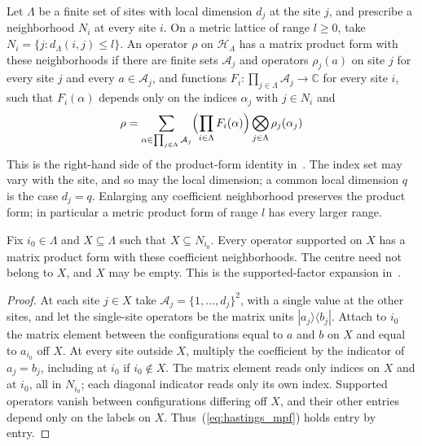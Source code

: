 \begin{definition}
    \label{def:hastings_product_form}
    \leanok
    Let $\Lambda$ be a finite set of sites with local dimension $d_j$ at the
    site $j$, and prescribe a neighborhood $N_i$ at every site $i$. On a
    metric lattice of range $l\ge0$, take $N_i=\{j:d_\Lambda(i,j)\le l\}$.
    An operator $\rho$ on $\mathcal H_\Lambda$ has a matrix product form
    with these neighborhoods if there are finite sets $\mathcal A_j$ and operators
    $\rho_j(a)$ on site $j$ for every site $j$ and every
    $a\in\mathcal A_j$, and functions
    $F_i\colon\prod_{j\in\Lambda}\mathcal A_j\to\mathbb C$
    for every site $i$, such that $F_i(\alpha)$ depends only on the indices
    $\alpha_j$ with $j\in N_i$ and
    \begin{align}
        \label{eq:hastings_mpf}
        \rho=\sum_{\alpha\in\prod_{j\in\Lambda}\mathcal A_j}
        \Bigl(\prod_{i\in\Lambda}F_i(\alpha)\Bigr)
        \bigotimes_{j\in\Lambda}\rho_j(\alpha_j)
    \end{align}
    This is the right-hand side of the product-form identity in~\cite[lines
        1024--1039]{Hastings2006Solving}. The index set may vary with the site,
    and so may the local dimension; a common local dimension $q$ is the case
    $d_j=q$.
    Enlarging any coefficient neighborhood
    preserves the product form; in particular a metric product form of range
    $l$ has every larger range.
\end{definition}

\begin{lemma}
    \label{thm:hastings_product_form_supported_radius}
    \leanok
    Fix $i_0\in\Lambda$ and $X\subseteq\Lambda$ such that
    $X\subseteq N_{i_0}$.
    Every operator supported on $X$ has a matrix product form with these
    coefficient neighborhoods.
    The centre need not belong to $X$, and $X$ may be empty.
    This is the supported-factor expansion
    in~\cite[lines 1053--1061]{Hastings2006Solving}.
\end{lemma}
\begin{proof}\leanok
    At each site $j\in X$ take $\mathcal A_j=\{1,\dots,d_j\}^2$, with a single value at the other sites, and let the single-site operators be
    the matrix units $|a_j\rangle\langle b_j|$. Attach to $i_0$ the matrix
    element between the configurations equal to $a$ and $b$ on $X$ and
    equal to $a_{i_0}$ off $X$. At every site outside $X$, multiply the
    coefficient by the indicator of $a_j=b_j$, including at $i_0$ if
    $i_0\notin X$. The matrix element reads only indices on $X$ and at
    $i_0$, all in $N_{i_0}$; each diagonal indicator reads only its
    own index. Supported operators vanish between configurations differing
    off $X$, and their other entries depend only on the labels on $X$.
    Thus~(\ref{eq:hastings_mpf}) holds entry by entry.
\end{proof}

